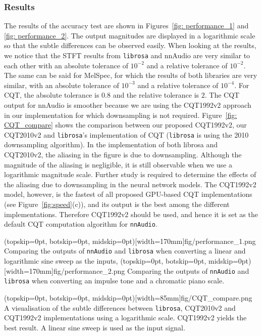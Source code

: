 \documentclass{ieeeaccess}
\newcommand{\nbh}[1]{\texttt{#1}}
\begin{document}
\subsubsection{Results}
The results of the accuracy test are shown in Figures~\ref{fig: performance_1} and \ref{fig: performance_2}. The output magnitudes are displayed in a logarithmic scale so that the subtle differences can be observed easily. When looking at the results, we notice that the STFT results from \nbh{librosa} and nnAudio are very similar to each other with an absolute tolerance of $10^{-2}$ and a relative tolerance of $10^{-2}$. The same can be said for MelSpec, for which the results of both libraries are very similar, with an absolute tolerance of $10^{-3}$ and a relative tolerance of $10^{-4}$. For CQT, the absolute tolerance is $0.8$ and the relative tolerance is $2$. The CQT output for nnAudio is smoother because we are using the CQT1992v2 approach in our implementation for which downsampling is not required. Figure~\ref{fig: CQT_compare} shows the comparison between our proposed CQT1992v2, our CQT2010v2 and \nbh{librosa}'s implementation of CQT (\nbh{librosa} is using the 2010 downsampling algorithm). In the implementation of both librosa and CQT2010v2, the aliasing in the figure is due to downsampling. Although the magnitude of the aliasing is negligible, it is still observable when we use a logarithmic magnitude scale. Further study is required to determine the effects of the aliasing due to downsampling in the neural network models. The CQT1992v2 model, however, is the fastest of all proposed GPU-based CQT implementations (see Figure~\ref{fig:speed}(c)), and its output is the best among the different implementations. Therefore CQT1992v2 should be used, and hence it is set as the default CQT computation algorithm for \nbh{nnAudio}.

\Figure(topskip=0pt, botskip=0pt, midskip=0pt)[width=170mm]{fig/performance_1.png}
{Comparing the outputs of \nbh{nnAudio} and \nbh{librosa} when converting a linear and logarithmic sine sweep as the inputs, \label{fig: performance_1}}
\Figure(topskip=0pt, botskip=0pt, midskip=0pt)[width=170mm]{fig/performance_2.png}
{Comparing the outputs of \nbh{nnAudio} and \nbh{librosa} when converting an impulse tone and a chromatic piano scale. \label{fig: performance_2}}



\Figure(topskip=0pt, botskip=0pt, midskip=0pt)[width=85mm]{fig/CQT_compare.png}
{A visualisation of the subtle differences between \nbh{librosa}, CQT2010v2 and CQT1992v2 implementations using a logarithmic scale. CQT1992v2 yields the best result. A linear sine sweep is used as the input signal.\label{fig: CQT_compare}}
\end{document}
